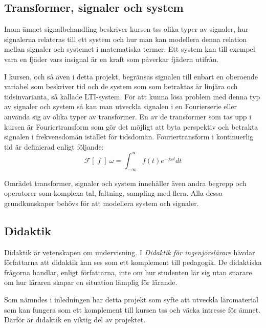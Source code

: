 \documentclass[12pt,a4paper,twoside,openright]{article}
\begin{document}
\subsection{Transformer, signaler och system}
Inom ämnet signalbehandling beskriver kursen \gls{tss} olika typer av
signaler, hur signalerna relateras till ett system och hur man kan
modellera denna relation mellan signaler och systemet i matematiska
termer. Ett system kan till exempel vara en fjäder vars insignal är en
kraft som påverkar fjädern utifrån.

I kursen, och så även i detta projekt, begränsas signalen till enbart
en oberoende variabel som beskriver tid och de system som som
betraktas är linjära och tidsinvarianta, så kallade LTI-system. För
att kunna lösa problem med denna typ av signaler och system så kan man
utveckla signalen i en Fourierserie eller använda sig av olika typer
av transformer. En av de transformer som tas upp i kursen är
Fouriertransform som gör det möjligt att byta perspektiv och betrakta
signalen i frekvensdomän istället för tidsdomän.
%
%
Fouriertransform i kontinuerlig tid är definierad enligt följande:
\[\mathcal{F}[\;f\;]~\omega = \int_{-\infty}^{\infty} f(t) e^{-j \omega t} dt\]

Området transformer, signaler och system innehåller även andra begrepp
och operatorer som komplexa tal, faltning, sampling med flera. Alla
dessa grundkunskaper behövs för att modellera system och signaler.

\subsection{Didaktik}
\label{sec:didaktik}
Didaktik är vetenskapen om undervisning. I \textit{Didaktik för
  ingenjörslärare} \cite{didaktik_for_ingenjorslarare} hävdar
författarna att didaktik kan ses som ett komplement till pedagogik. De
didaktiska frågorna handlar, enligt författarna, inte om hur studenten
lär sig utan snarare om hur läraren skapar en situation lämplig för
lärande.

Som nämndes i inledningen har detta projekt som syfte att utveckla
läromaterial som kan fungera som ett komplement till kursen \gls{tss}
och väcka intresse för ämnet. Därför är didaktik en viktig del av
projektet.
\end{document}

